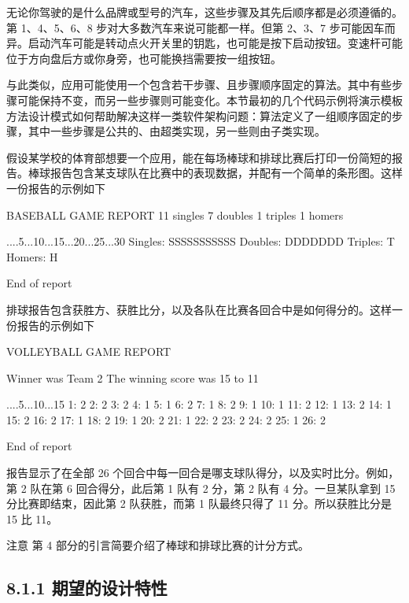 无论你驾驶的是什么品牌或型号的汽车，这些步骤及其先后顺序都是必须遵循的。第 1、4、5、6、8 步对大多数汽车来说可能都一样。但第 2、3、7 步可能因车而异。启动汽车可能是转动点火开关里的钥匙，也可能是按下启动按钮。变速杆可能位于方向盘后方或你身旁，也可能换挡需要按一组按钮。

与此类似，应用可能使用一个包含若干步骤、且步骤顺序固定的算法。其中有些步骤可能保持不变，而另一些步骤则可能变化。本节最初的几个代码示例将演示模板方法设计模式如何帮助解决这样一类软件架构问题：算法定义了一组顺序固定的步骤，其中一些步骤是公共的、由超类实现，另一些则由子类实现。

假设某学校的体育部想要一个应用，能在每场棒球和排球比赛后打印一份简短的报告。棒球报告包含某支球队在比赛中的表现数据，并配有一个简单的条形图。这样一份报告的示例如下

\begin{codebox}
BASEBALL GAME REPORT
11 singles
 7 doubles
 1 triples
 1 homers
 
         ....5...10...15...20...25...30
Singles: SSSSSSSSSSS
Doubles: DDDDDDD
Triples: T
 Homers: H
 
End of report
\end{codebox}

排球报告包含获胜方、获胜比分，以及各队在比赛各回合中是如何得分的。这样一份报告的示例如下

\begin{codebox}
VOLLEYBALL GAME REPORT

Winner was Team 2
The winning score was 15 to 11

     ....5...10...15
  1: 2
  2:  2
  3:   2
  4: 1
  5:  1
  6:    2
  7:   1
  8:     2
  9:    1
 10:     1
 11:      2
 12:      1
 13:       2
 14:       1
 15:        2
 16:         2
 17:        1
 18:          2
 19:         1
 20:           2
 21:          1
 22:            2
 23:             2
 24:              2
 25:           1
 26:               2
 
End of report
\end{codebox}

报告显示了在全部 26 个回合中每一回合是哪支球队得分，以及实时比分。例如，第 2 队在第 6 回合得分，此后第 1 队有 2 分，第 2 队有 4 分。一旦某队拿到 15 分比赛即结束，因此第 2 队获胜，而第 1 队最终只得了 11 分。所以获胜比分是 15 比 11。

\begin{myWarning}{注意}
第 4 部分的引言简要介绍了棒球和排球比赛的计分方式。
\end{myWarning}

\subsection{8.1.1 期望的设计特性}

